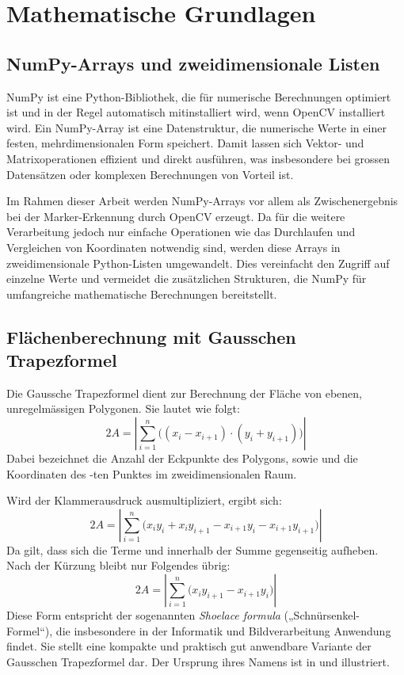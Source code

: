 \section{Mathematische Grundlagen}

\subsection{NumPy-Arrays und zweidimensionale Listen}
\label{sub:numpy}
NumPy ist eine Python-Bibliothek, die für numerische Berechnungen optimiert ist und in der Regel automatisch mitinstalliert wird, wenn OpenCV installiert wird.
Ein NumPy-Array ist eine Datenstruktur, die numerische Werte in einer festen, mehrdimensionalen Form speichert.
Damit lassen sich Vektor- und Matrixoperationen effizient und direkt ausführen, was insbesondere bei grossen Datensätzen oder komplexen Berechnungen von Vorteil ist.

Im Rahmen dieser Arbeit werden NumPy-Arrays vor allem als Zwischenergebnis bei der Marker-Erkennung durch OpenCV erzeugt.
Da für die weitere Verarbeitung jedoch nur einfache Operationen wie das Durchlaufen und Vergleichen von Koordinaten notwendig sind, werden diese Arrays in zweidimensionale Python-Listen umgewandelt.
Dies vereinfacht den Zugriff auf einzelne Werte und vermeidet die zusätzlichen Strukturen, die NumPy für umfangreiche mathematische Berechnungen bereitstellt.

\subsection{Flächenberechnung mit Gausschen Trapezformel}
\label{sub:gauTrap}

Die Gaussche Trapezformel dient zur Berechnung der Fläche  von ebenen, unregelmässigen Polygonen. Sie lautet wie folgt:
\[
2A = \left| \sum_{i=1}^{n} \big((x_i - x_{i+1}) \cdot (y_i + y_{i+1}) \big) \right|
\]
Dabei bezeichnet  die Anzahl der Eckpunkte des Polygons, sowie  und  die Koordinaten des -ten Punktes im zweidimensionalen Raum.

Wird der Klammerausdruck ausmultipliziert, ergibt sich:
\[
2A = \left| \sum_{i=1}^{n} \big( x_i y_i + x_i y_{i+1} - x_{i+1} y_i - x_{i+1} y_{i+1} \big) \right|
\]
Da gilt, dass sich die Terme  und  innerhalb der Summe gegenseitig aufheben.
Nach der Kürzung bleibt nur Folgendes übrig:
\[
2A = \left| \sum_{i=1}^{n} \big( x_i y_{i+1} - x_{i+1} y_i \big) \right|
\]
Diese Form entspricht der sogenannten \textit{Shoelace formula} („Schnürsenkel-Formel“), die insbesondere in der Informatik und Bildverarbeitung Anwendung findet.
Sie stellt eine kompakte und praktisch gut anwendbare Variante der Gausschen Trapezformel dar.\footnotemark
{}
Der Ursprung ihres Namens ist in  und  illustriert.\footnotemark
{}

